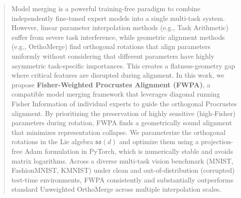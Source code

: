 \documentclass{article}
\theoremstyle{plain}
\theoremstyle{definition}
\theoremstyle{remark}
\begin{document}

\begin{abstract}
Model merging is a powerful training-free paradigm to combine independently fine-tuned expert models into a single multi-task system. However, linear parameter interpolation methods (e.g., Task Arithmetic) suffer from severe task interference, while geometric alignment methods (e.g., OrthoMerge) find orthogonal rotations that align parameters uniformly without considering that different parameters have highly asymmetric task-specific importances. This creates a flatness-geometry gap where critical features are disrupted during alignment. In this work, we propose \textbf{Fisher-Weighted Procrustes Alignment (FWPA)}, a compatible model merging framework that leverages diagonal running Fisher Information of individual experts to guide the orthogonal Procrustes alignment. By prioritizing the preservation of highly sensitive (high-Fisher) parameters during rotation, FWPA finds a geometrically sound alignment that minimizes representation collapse. We parameterize the orthogonal rotations in the Lie algebra $\mathfrak{so}(d)$ and optimize them using a projection-free Adam formulation in PyTorch, which is numerically stable and avoids matrix logarithms. Across a diverse multi-task vision benchmark (MNIST, FashionMNIST, KMNIST) under clean and out-of-distribution (corrupted) test-time environments, FWPA consistently and substantially outperforms standard Unweighted OrthoMerge across multiple interpolation scales.
\end{abstract}
\end{document}
